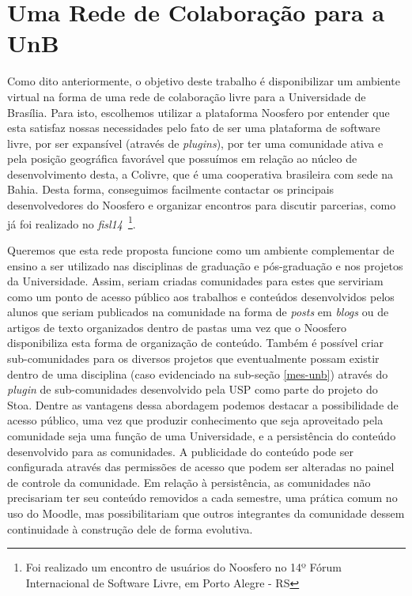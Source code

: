 \chapter{Uma Rede de Colaboração para a UnB}

Como dito anteriormente, o objetivo deste trabalho é disponibilizar um ambiente
virtual na forma de uma rede de colaboração livre para a Universidade de
Brasília. Para isto, escolhemos utilizar a plataforma Noosfero por entender que
esta satisfaz nossas necessidades pelo fato de ser uma plataforma de software
livre, por ser expansível (através de \textit{plugins}), por ter uma comunidade
ativa e pela posição geográfica favorável que possuímos em relação ao núcleo de
desenvolvimento desta, a Colivre, que é uma cooperativa brasileira com sede na
Bahia. Desta forma, conseguimos facilmente contactar os principais desenvolvedores
do Noosfero e organizar encontros para discutir parcerias, como já foi realizado
no \textit{fisl14}~\footnote{Foi realizado um encontro de usuários do Noosfero
no 14º Fórum Internacional de Software Livre, em Porto Alegre - RS}.

Queremos que esta rede proposta funcione como um ambiente complementar de ensino
a ser utilizado nas disciplinas de graduação e pós-graduação e nos projetos da
Universidade. Assim, seriam criadas comunidades para estes
que serviriam como um ponto de acesso público aos trabalhos e conteúdos
desenvolvidos pelos alunos que seriam publicados
na comunidade na forma de \textit{posts} em \textit{blogs} ou de artigos de
texto organizados dentro de pastas uma vez que o Noosfero disponibiliza esta
forma de organização de conteúdo.
%
Também é possível criar sub-comunidades para os diversos projetos que
eventualmente possam existir dentro de uma disciplina (caso evidenciado na
sub-seção \ref{mes-unb}) através do \textit{plugin} de sub-comunidades
desenvolvido pela USP como parte do projeto do Stoa.
%
Dentre as vantagens dessa abordagem podemos destacar a possibilidade de acesso
público, uma vez que produzir conhecimento que seja aproveitado pela comunidade
seja uma função de uma Universidade, e a persistência do conteúdo desenvolvido
para as comunidades. A publicidade do conteúdo pode ser configurada através das
permissões de acesso que podem ser alteradas no painel de controle da comunidade.
Em relação à persistência, as comunidades não precisariam ter seu conteúdo
removidos a cada semestre, uma prática comum no uso do Moodle, mas
possibilitariam que outros integrantes da comunidade dessem continuidade à
construção dele de forma evolutiva.

